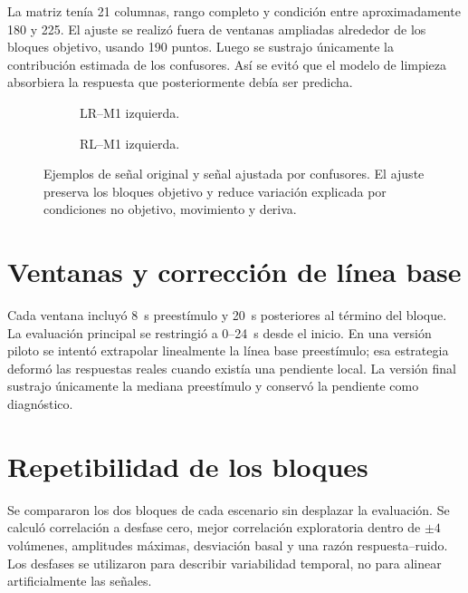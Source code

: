 La matriz tenía 21 columnas, rango completo y condición entre aproximadamente 180 y 225. El ajuste se realizó fuera de ventanas ampliadas alrededor de los bloques objetivo, usando 190 puntos. Luego se sustrajo únicamente la contribución estimada de los confusores. Así se evitó que el modelo de limpieza absorbiera la respuesta que posteriormente debía ser predicha.

\begin{figure}[H]
\centering
\begin{subfigure}[t]{0.49\textwidth}
\caption{LR--M1 izquierda.}
\end{subfigure}\hfill
\begin{subfigure}[t]{0.49\textwidth}
\caption{RL--M1 izquierda.}
\end{subfigure}
\caption{Ejemplos de señal original y señal ajustada por confusores. El ajuste preserva los bloques objetivo y reduce variación explicada por condiciones no objetivo, movimiento y deriva.}
\label{fig:real_adjusted_examples}
\end{figure}

\section{Ventanas y corrección de línea base}
Cada ventana incluyó \SI{8}{s} preestímulo y \SI{20}{s} posteriores al término del bloque. La evaluación principal se restringió a $0$--\SI{24}{s} desde el inicio. En una versión piloto se intentó extrapolar linealmente la línea base preestímulo; esa estrategia deformó las respuestas reales cuando existía una pendiente local. La versión final sustrajo únicamente la mediana preestímulo y conservó la pendiente como diagnóstico.

\section{Repetibilidad de los bloques}
Se compararon los dos bloques de cada escenario sin desplazar la evaluación. Se calculó correlación a desfase cero, mejor correlación exploratoria dentro de $\pm4$ volúmenes, amplitudes máximas, desviación basal y una razón respuesta--ruido. Los desfases se utilizaron para describir variabilidad temporal, no para alinear artificialmente las señales.


